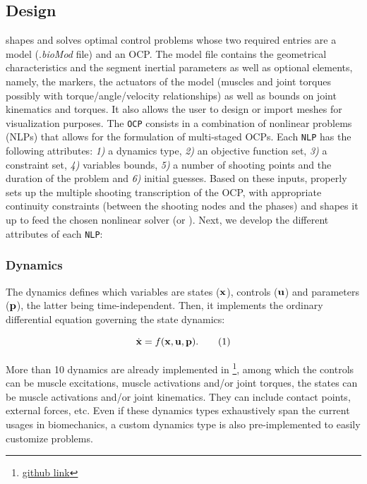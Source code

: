 \subsection{Design}
\bioptim shapes and solves optimal control problems whose two required entries are a model (.\textit{bioMod} file) and an OCP.
The model file contains the geometrical characteristics and the segment inertial parameters as well as optional elements, namely, the markers, the actuators of the model (muscles and joint torques possibly with torque/angle/velocity relationships) as well as bounds on joint kinematics and torques. 
It also allows the user to design or import meshes for visualization purposes.
The \texttt{OCP} consists in a combination of nonlinear problems (NLPs) that allows for the formulation of multi-staged OCPs. 
Each \texttt{NLP} has the following attributes: \textit{1)} a dynamics type, \textit{2)} an objective function set, \textit{3)} a constraint set, \textit{4)} variables bounds, \textit{5)} a number of shooting points and the duration of the problem and \textit{6)} initial guesses.
Based on these inputs, \bioptim properly sets up the multiple shooting transcription of the OCP, with appropriate continuity constraints (between the shooting nodes and the phases) and shapes it up to feed the chosen nonlinear solver (\ipopt or \acados). 
Next, we develop the different attributes of each \texttt{NLP}:

\subsubsection{Dynamics}
The dynamics defines which variables are states ($\mathbf{x}$), controls ($\mathbf{u}$) and parameters ($\mathbf{p}$), the latter being time-independent.
Then, it implements the ordinary differential equation governing the state dynamics:

\[
\dstate = f(\state, \control, \param).
\addtag
\label{eq:state_transition}
\]

\noindent More than 10 dynamics are already implemented in \bioptim \footnote{\href{https://github.com/pyomeca/bioptim/blob/master/bioptim/dynamics/dynamics_functions.py}{github link}}, among which the controls can be muscle excitations, muscle activations and/or joint torques, the states can be muscle activations and/or joint kinematics.
They can include contact points, external forces, etc.
Even if these dynamics types exhaustively span the current usages in biomechanics, a custom dynamics type is also pre-implemented to easily customize problems.

